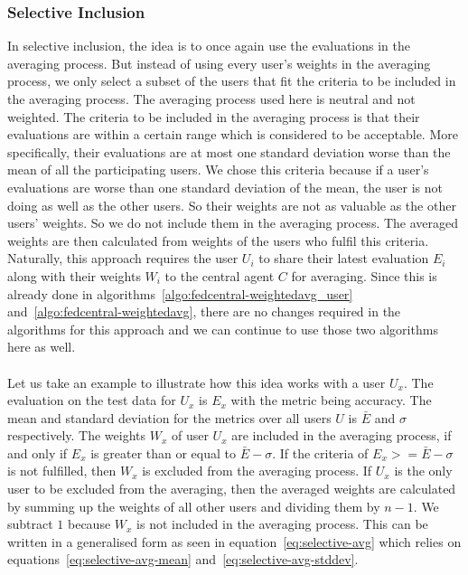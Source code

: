 \documentclass[12pt]{article}
\begin{document}
\subsubsection{Selective Inclusion}\label{subsubsec:selective-inclusion}
In selective inclusion, the idea is to once again use the evaluations in the averaging process. But instead of using every user's weights in the averaging process, we only select a subset of the users that fit the criteria to be included in the averaging process. The averaging process used here is neutral and not weighted. The criteria to be included in the averaging process is that their evaluations are within a certain range which is considered to be acceptable. More specifically, their evaluations are at most one standard deviation worse than the mean of all the participating users. We chose this criteria because if a user's evaluations are worse than one standard deviation of the mean, the user is not doing as well as the other users. So their weights are not as valuable as the other users' weights. So we do not include them in the averaging process.  The averaged weights are then calculated from weights of the users who fulfil this criteria. Naturally, this approach requires the user $U_i$ to share their latest evaluation $E_i$ along with their weights $W_i$ to the central agent $C$ for averaging. Since this is already done in algorithms~\ref{algo:fedcentral-weightedavg_user} and~\ref{algo:fedcentral-weightedavg}, there are no changes required in the algorithms for this approach and we can continue to use those two algorithms here as well.
\\\\
Let us take an example to illustrate how this idea works with a user $U_x$. The evaluation on the test data for $U_x$ is $E_x$ with the metric being accuracy. The mean and standard deviation for the metrics over all users $U$ is $\bar{E}$ and $\sigma$ respectively. The weights $W_x$ of user $U_x$ are included in the averaging process, if and only if $E_x$ is greater than or equal to $\bar{E}-\sigma$. If the criteria of $E_x >= \bar{E}-\sigma$ is not fulfilled, then $W_x$ is excluded from the averaging process. If $U_x$ is the only user to be excluded from the averaging, then the averaged weights are calculated by summing up the weights of all other users and dividing them by $n-1$. We subtract $1$ because $W_x$ is not included in the averaging process. This can be written in a generalised form as seen in equation~\ref{eq:selective-avg} which relies on equations~\ref{eq:selective-avg-mean} and~\ref{eq:selective-avg-stddev}.
\end{document}
